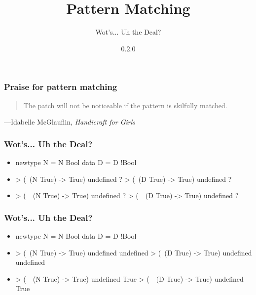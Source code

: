 \documentclass{beamer}
\title{Pattern Matching}
\subtitle{Wot's... Uh the Deal?}
\author{}
\institute{Stack Builders}
\date{0.2.0}
\begin{document}

\frame{\titlepage}


\begin{frame}
  \frametitle{Praise for pattern matching}

  \begin{quote}
    The patch will not be noticeable if the pattern is skilfully
    matched.
  \end{quote}
  \hfill---Idabelle McGlauflin, \emph{Handicraft for Girls}
\end{frame}


\begin{frame}[fragile]
  \frametitle{Wot's... Uh the Deal?}

  \begin{itemize}
  \item
    \begin{code}
newtype N = N  Bool
data    D = D !Bool
    \end{code}
  \item
    \begin{code}
> (\  (N True) -> True) undefined
?
> (\  (D True) -> True) undefined
?
    \end{code}
  \item
    \begin{code}
> (\ ~(N True) -> True) undefined
?
> (\ ~(D True) -> True) undefined
?
    \end{code}
  \end{itemize}
\end{frame}

\begin{frame}[fragile]
  \frametitle{Wot's... Uh the Deal?}

  \begin{itemize}
  \item
    \begin{code}
newtype N = N  Bool
data    D = D !Bool
    \end{code}
  \item
    \begin{code}
> (\  (N True) -> True) undefined
undefined
> (\  (D True) -> True) undefined
undefined
    \end{code}
  \item
    \begin{code}
> (\ ~(N True) -> True) undefined
True
> (\ ~(D True) -> True) undefined
True
    \end{code}
  \end{itemize}
\end{frame}
\end{document}
